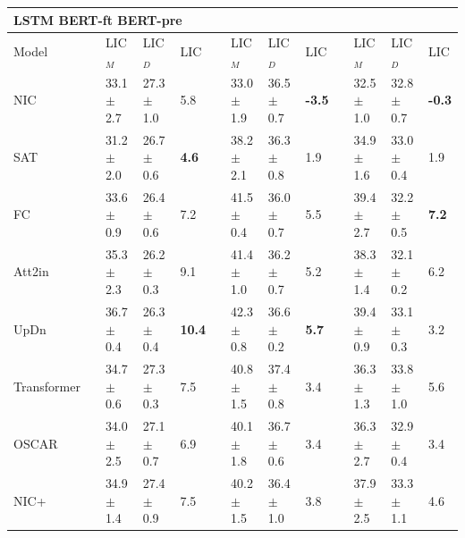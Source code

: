     
    \begin{table}[ht]
    \begin{adjustbox}{width=\columnwidth,center}
  \begin{tabular}{@{}lllllllllllll@{}}
    \toprule
    \multicolumn{13}{l}{\hspace{4.5cm}LSTM \hspace{4cm}BERT-ft \hspace{4cm}BERT-pre} 
       \\ \midrule 
 Model &  & LIC$_{M}$ & LIC$_{D}$ &  LIC &  & LIC$_{M}$ & LIC$_{D}$ &  LIC &   & LIC$_{M}$ & LIC$_{D}$ &  LIC   \\ \midrule 
 
NIC           &  & 33.1 $\pm$ 2.7  & 27.3 $\pm$ 1.0 & 5.8 &  & 33.0 $\pm$ 1.9  &  36.5 $\pm$ 0.7 & \color[HTML]{32CB00} \textbf{-3.5} &  & 32.5 $\pm$ 1.0  & 32.8 $\pm$ 0.7 & \color[HTML]{32CB00} \textbf{-0.3} \\

SAT           &  & 31.2 $\pm$ 2.0  & 26.7 $\pm$ 0.6 & \color[HTML]{32CB00} \textbf{4.6}  &  & 38.2 $\pm$ 2.1  & 36.3 $\pm$ 0.8 & 1.9 &  & 34.9 $\pm$ 1.6  & 33.0 $\pm$ 0.4 & 1.9 \\	

FC           &  & 33.6 $\pm$ 0.9  & 26.4 $\pm$ 0.6 & 7.2  &  & 41.5 $\pm$ 0.4  & 36.0 $\pm$ 0.7 & 5.5 &  & 39.4 $\pm$ 2.7  & 32.2 $\pm$ 0.5 & \color[HTML]{CB0000} \textbf{7.2} \\		

Att2in           &  & 35.3 $\pm$ 2.3  & 26.2 $\pm$ 0.3 & 9.1  &  & 41.4 $\pm$ 1.0  & 36.2 $\pm$ 0.7 & 5.2  &  & 38.3 $\pm$ 1.4  & 32.1 $\pm$ 0.2 & 6.2 \\

UpDn           &  & 36.7 $\pm$ 0.4  & 26.3 $\pm$ 0.4 & \color[HTML]{CB0000} \textbf{10.4} &  & 42.3 $\pm$ 0.8  & 36.6 $\pm$ 0.2 & \color[HTML]{CB0000} \textbf{5.7} &  & 39.4 $\pm$ 0.9  & 33.1 $\pm$ 0.3 & 3.2 \\	

Transformer           &  & 34.7 $\pm$ 0.6  & 27.3 $\pm$ 0.3 & 7.5 &  & 40.8 $\pm$ 1.5  & 37.4 $\pm$ 0.8 & 3.4  &  & 36.3 $\pm$ 1.3  & 33.8 $\pm$ 1.0 & 5.6 \\	

OSCAR           &  & 34.0 $\pm$ 2.5  & 27.1 $\pm$ 0.7 & 6.9 &  & 40.1 $\pm$ 1.8  & 36.7 $\pm$ 0.6 & 3.4  &  & 36.3 $\pm$ 2.7  & 32.9 $\pm$ 0.4 & 3.4 \\

NIC+           &  & 34.9 $\pm$ 1.4  & 27.4 $\pm$ 0.9 & 7.5 &  & 40.2 $\pm$ 1.5 &  36.4 $\pm$ 1.0 & 3.8 & & 37.9 $\pm$ 2.5 & 33.3 $\pm$ 1.1 & 4.6 \\	


\end{tabular}
\end{adjustbox}
\end{table}
